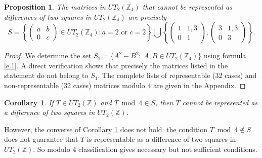 \documentclass[11pt]{amsart}
\newtheorem{corollary}[theorem]{Corollary}
\newtheorem{proposition}[theorem]{Proposition}
\begin{document}
 \begin{proposition}\label{p1}
The matrices in $UT_2(\mathbb Z_4)$ that cannot be represented as differences of two squares in $UT_2(\mathbb Z_4)$ are precisely
$$S=\left\{
\begin{pmatrix}
a & b\\
0 & c
\end{pmatrix}\in UT_2(\mathbb Z_4) : a=2 \text{ or } c=2 \right\}\bigcup 
\left\{ \begin{pmatrix}
1 & 1,3\\
0 & 1
\end{pmatrix}, \begin{pmatrix}
3 & 1,3\\
0 & 3
\end{pmatrix}\right\}. $$
\end{proposition}
\begin{proof}
We determine the set $S_1=\{A^2-B^2:\ A,B\in UT_2(\mathbb Z_4)\}$
using formula \eqref{e.1}. A direct verification shows that precisely the matrices listed in the statement do not belong to $S_1$. The complete lists of representable (32 cases) and non-representable (32 cases) matrices modulo $4$ are given in the Appendix.
\end{proof}


\begin{corollary}\label{cor:not_sq_mod_4}
    If $T\in UT_2(\mathbb Z)$ and $T \bmod 4 \in S$, then $T$ cannot be represented as a difference of two squares in $UT_2(\mathbb Z)$. 
\end{corollary}

However, the converse of Corollary \ref{cor:not_sq_mod_4}  does not hold: the condition $T \bmod 4 \notin S$ does not guarantee that $T$ is representable as a difference of two squares in $UT_2(\mathbb Z)$. So modulo 4 classification gives necessary but not sufficient conditions.
\end{document}
